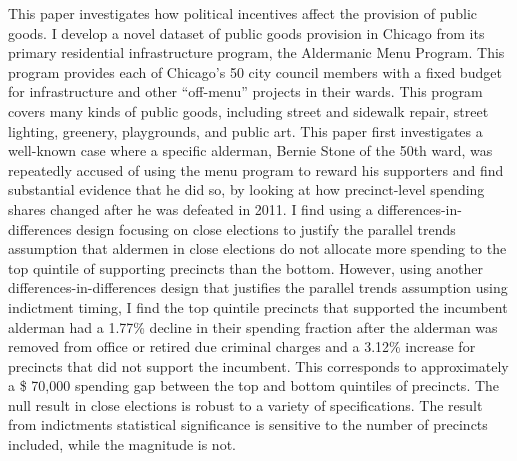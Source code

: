 \begin{spacing}{1.0}
This paper investigates how political incentives affect the provision of public goods.
I develop a novel dataset of public goods provision in Chicago from its primary residential infrastructure program, the Aldermanic Menu Program.
This program provides each of Chicago's 50 city council members with a fixed budget for infrastructure and other ``off-menu'' projects in their wards.
This program covers many kinds of public goods, including street and sidewalk repair, street lighting, greenery, playgrounds, and public art.
This paper first investigates a well-known case where a specific alderman, Bernie Stone of the 50th ward, was repeatedly accused of using the menu program to reward his supporters and find substantial evidence that he did so, by looking at how precinct-level spending shares changed after he was defeated in 2011.
I find using a differences-in-differences design focusing on close elections to justify the parallel trends assumption that aldermen in close elections do not allocate more spending to the top quintile of supporting precincts than the bottom.
However, using another differences-in-differences design that justifies the parallel trends assumption using indictment timing, I find the top quintile precincts that supported the incumbent alderman had a 1.77\% decline in their spending fraction after the alderman was removed from office or retired due criminal charges and a 3.12\% increase for precincts that did not support the incumbent.
This corresponds to approximately a \$ 70,000 spending gap between the top and bottom quintiles of precincts. 
The null result in close elections is robust to a variety of specifications.
The result from indictments statistical significance is sensitive to the number of precincts included, while the magnitude is not.
\end{spacing}